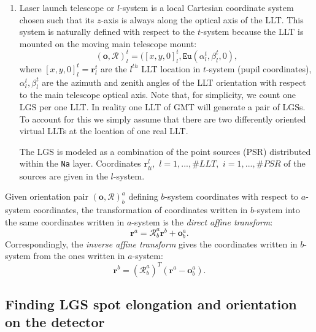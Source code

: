 \begin{enumerate}
	\item Laser launch telescope or $l$-system is a local Cartesian coordinate
	system chosen such that its $z$-axis is always along the optical axis of the
	LLT. This system is naturally defined with respect to the $t$-system because
	the LLT is mounted on the moving main telescope mount:
	\begin{equation} \label{eq:l-system}
		(\bm{o},\mathcal{R})_{l}^{t} = ([x,y,0]_{l}^{t},
                                 \texttt{Eu}(\alpha_{l}^{t},\beta_{l}^{t},0),
	\end{equation}
	where $[x,y,0]_{l}^{t} = \bm{r}_{l}^{t}$ are the $l^{th}$ LLT location in
	$t$-system (pupil
	coordinates), $\alpha_{l}^{t},\beta_{l}^{t}$ are the azimuth and zenith
	angles of the LLT orientation with respect to the main telescope optical
	axis. Note that, for simplicity, we count one LGS per one LLT. In reality
	one LLT of GMT will generate a pair of LGSs. To account for this we simply
	assume that there are two differently oriented virtual LLTs at the location
	of one real LLT.

	The LGS is modeled as a combination of the point sources (PSR) distributed
	within the \texttt{Na} layer. Coordinates
	$\bm{r}_{li}^{l}, \,\, l =
	1,...,\#LLT, \,\, i=1,...,\#PSR$ of the sources are given in the $l$-system.
\end{enumerate}

Given orientation pair $(\bm{o},\mathcal{R})_{b}^{a}$ defining $b$-system
coordinates with respect to $a$-system coordinates, the transformation of
coordinates written in $b$-system into the same coordinates written in
$a$-system is the \emph{direct affine transform}: 
\begin{equation} \label{eq:direct-affine}
	\bm{r}^{a} = \mathcal{R}_{b}^{a} \bm{r}^{b} + \bm{o}_{b}^{a}.
\end{equation}
Correspondingly, the \emph{inverse affine transform} gives the coordinates
written in $b$-system from the ones written in $a$-system:
\begin{equation} \label{eq:inverse-affine}
	\bm{r}^{b} = (\mathcal{R}_{b}^{a})^{T} (\bm{r}^{a} - \bm{o}_{b}^{a}).
\end{equation}


\subsection{Finding LGS spot elongation and orientation on the detector}
\label{sec:elongation-orientation}

